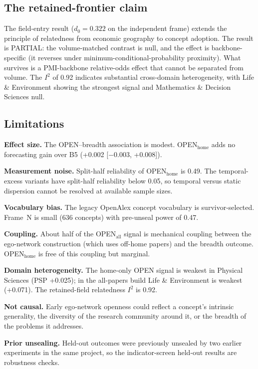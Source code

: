 \documentclass[11pt,letterpaper]{article}
\begin{document}
\subsection{The retained-frontier claim}

The field-entry result ($d_0 = 0.322$ on the independent frame) extends the principle of relatedness from economic geography \citep{Hidalgo2007,Boschma2015} to concept adoption. The result is PARTIAL: the volume-matched contrast is null, and the effect is backbone-specific (it reverses under minimum-conditional-probability proximity). What survives is a PMI-backbone relative-odds effect that cannot be separated from volume. The $I^2$ of 0.92 indicates substantial cross-domain heterogeneity, with Life \& Environment showing the strongest signal and Mathematics \& Decision Sciences null.

\subsection{Limitations}

\textbf{Effect size.} The OPEN--breadth association is modest. OPEN$_{\text{home}}$ adds no forecasting gain over B5 (+0.002 [$-$0.003, +0.008]).

\textbf{Measurement noise.} Split-half reliability of OPEN$_{\text{home}}$ is 0.49. The temporal-excess variants have split-half reliability below 0.05, so temporal versus static dispersion cannot be resolved at available sample sizes.

\textbf{Vocabulary bias.} The legacy OpenAlex concept vocabulary is survivor-selected. Frame~N is small (636 concepts) with pre-unseal power of 0.47.

\textbf{Coupling.} About half of the OPEN$_{\text{all}}$ signal is mechanical coupling between the ego-network construction (which uses off-home papers) and the breadth outcome. OPEN$_{\text{home}}$ is free of this coupling but marginal.

\textbf{Domain heterogeneity.} The home-only OPEN signal is weakest in Physical Sciences (PSP +0.025); in the all-papers build Life \& Environment is weakest (+0.071). The retained-field relatedness $I^2$ is 0.92.

\textbf{Not causal.} Early ego-network openness could reflect a concept's intrinsic generality, the diversity of the research community around it, or the breadth of the problems it addresses.

\textbf{Prior unsealing.} Held-out outcomes were previously unsealed by two earlier experiments in the same project, so the indicator-screen held-out results are robustness checks.
\end{document}
